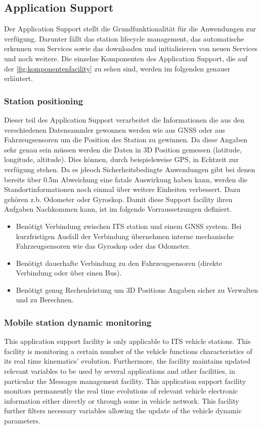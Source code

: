 \subsection{Application Support}
Der Application Support stellt die Grundfunktionalität für die Anwendungen zur verfügung. Darunter fällt das station lifecycle management, das automatische erkennen von Services sowie das downloaden und initialisieren von neuen Services und noch weitere. Die einzelne Komponenten des Application Support, die auf der \autoref{fig:komponentenfacility} zu sehen sind, werden im folgenden genauer erläutert. 

\subsubsection{Station positioning}
Dieser teil des Application Support verarbeitet die Informationen die aus den verschiedenen Datensammler gewonnen werden wie aus GNSS oder aus Fahrzeugsensoren um die Position des Station zu gewinnen. 
Da diese Angaben sehr genau sein müssen werden die Daten in 3D Position gemessen (latitude, longitude, altitude). Dies können, durch beispielsweise GPS, in Echtzeit zur verfügung stehen. Da es jdeoch Sicherheitsbedingte Anwendungen gibt bei denen bereits über 0.5m Abweichung eine fatale Auswirkung haben kann, werden die Standortinformationen noch einmal über weitere Einheiten verbessert. Dazu gehören z.b. Odometer oder Gyroskop.
Damit diese Support facility ihren Aufgaben Nachkommen kann, ist im \cite{etsi102638} folgende Vorraussetzungen definiert.

\begin{itemize}
\item Benötigt Verbindung zwischen ITS station und einem GNSS system. Bei kurzfristigen Ausfall der Verbindung übernehmen interne mechanische Fahrzeugsensoren wie das Gyroskop oder das Odometer.
\item Benötigt dauerhafte Verbindung zu den Fahrzeugsensoren (direkte Verbindung oder über einen Bus).
\item Benötigt genug Rechenleistung um 3D Positions Angaben sicher zu Verwalten und zu Berechnen.
\end{itemize}

\subsubsection{Mobile station dynamic monitoring}
This application support facility is only applicable to ITS vehicle stations. This facility is monitoring a certain number of the vehicle functions characteristics of its real time kinematics' evolution. Furthermore, the facility maintains updated relevant variables to be used by several applications and other facilities, in particular the Messages management facility. This application support facility monitors permanently the real time evolutions of relevant vehicle electronic information either directly or through some in vehicle network. This facility further filters necessary variables allowing the update of the vehicle dynamic parameters.

